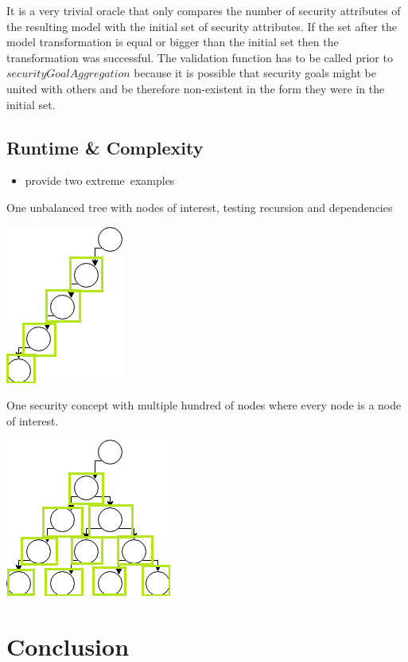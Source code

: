 It is a very trivial oracle that only compares the number of security attributes of the resulting model with the initial set of security attributes. If the set after the model transformation is equal or bigger than the initial set then the transformation was successful. The validation function has to be called prior to $securityGoalAggregation$ because it is possible that security goals might be united with others and be therefore non-existent in the form they were in the initial set. 

\subsection{Runtime \& Complexity}

\begin{itemize}
\item provide two \glqq extreme\grqq \ examples
\end{itemize}

One unbalanced tree with nodes of interest, testing recursion and dependencies

\includegraphics[scale=1]{pictures/unbalanced}

One security concept with multiple hundred of nodes where every node is a node of interest. 

\includegraphics[scale=1]{pictures/many_nodes}

\section{Conclusion}
\label{sec:conclusion}
